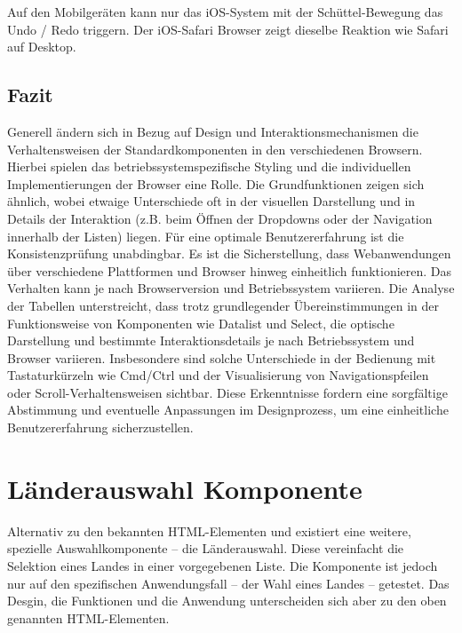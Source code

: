Auf den Mobilgeräten kann nur das iOS-System mit der Schüttel-Bewegung das Undo / Redo triggern.
Der iOS-Safari Browser zeigt dieselbe Reaktion wie Safari auf Desktop.


\clearpage
\subsection{Fazit}
\label{sec:summeryExisting}

Generell ändern sich in Bezug auf Design und Interaktionsmechanismen die Verhaltensweisen der Standardkomponenten in den verschiedenen Browsern. 
Hierbei spielen das betriebssystemspezifische Styling und die individuellen Implementierungen der Browser eine Rolle. 
Die Grundfunktionen zeigen sich ähnlich, wobei etwaige Unterschiede oft in der visuellen Darstellung und in Details der Interaktion (z.B. beim Öffnen der Dropdowns oder der Navigation innerhalb der Listen) liegen. 
Für eine optimale Benutzererfahrung ist die Konsistenzprüfung unabdingbar.
Es ist die Sicherstellung, dass Webanwendungen über verschiedene Plattformen und Browser hinweg einheitlich funktionieren. 
Das Verhalten kann je nach Browserversion und Betriebssystem variieren. 
Die Analyse der Tabellen unterstreicht, dass trotz grundlegender Übereinstimmungen in der Funktionsweise von Komponenten wie Datalist und Select, 
die optische Darstellung und bestimmte Interaktionsdetails je nach Betriebssystem und Browser variieren. 
Insbesondere sind solche Unterschiede in der Bedienung mit Tastaturkürzeln wie Cmd/Ctrl und der Visualisierung von Navigationspfeilen oder Scroll-Verhaltensweisen sichtbar. 
Diese Erkenntnisse fordern eine sorgfältige Abstimmung und eventuelle Anpassungen im Designprozess, um eine einheitliche Benutzererfahrung sicherzustellen.


\section{Länderauswahl Komponente}
\label{sec:countryChoice}

Alternativ zu den bekannten HTML-Elementen  und  existiert eine weitere, spezielle Auswahlkomponente – die Länderauswahl\citemarktext{
    [\cite{ip5}]
}.
Diese vereinfacht die Selektion eines Landes in einer vorgegebenen Liste. 
Die Komponente ist jedoch nur auf den spezifischen Anwendungsfall – der Wahl eines Landes – getestet.
Das Desgin, die Funktionen und die Anwendung unterscheiden sich aber zu den oben genannten HTML-Elementen.

